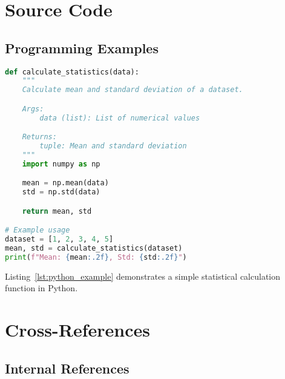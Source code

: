 \section{Source Code}
\label{sec:source_code}

\subsection*{Programming Examples}
\label{subsec:code_examples}

\begin{lstlisting}[language=Python, caption={Python function example}, label=lst:python_example]
def calculate_statistics(data):
    """
    Calculate mean and standard deviation of a dataset.

    Args:
        data (list): List of numerical values

    Returns:
        tuple: Mean and standard deviation
    """
    import numpy as np

    mean = np.mean(data)
    std = np.std(data)

    return mean, std

# Example usage
dataset = [1, 2, 3, 4, 5]
mean, std = calculate_statistics(dataset)
print(f"Mean: {mean:.2f}, Std: {std:.2f}")
\end{lstlisting}

Listing~\ref{lst:python_example} demonstrates a simple statistical calculation
function in Python.

\section{Cross-References}
\label{sec:cross_references}

\subsection*{Internal References}
\label{subsec:internal_refs}


